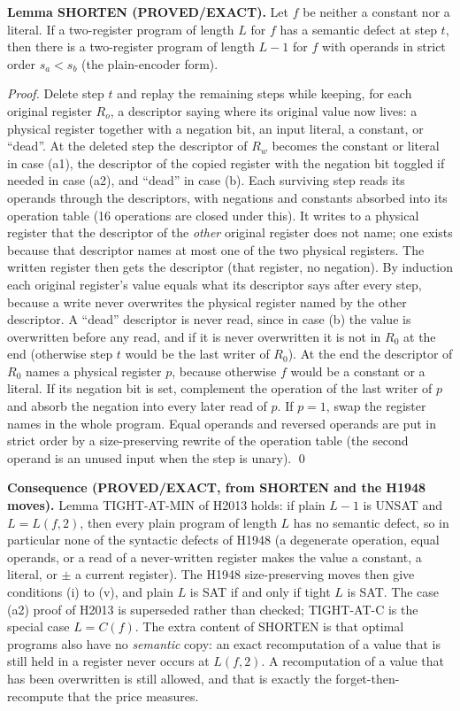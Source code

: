 \documentclass[11pt]{article}
\begin{document}
\textbf{Lemma SHORTEN (PROVED/EXACT).} Let $f$ be neither a constant nor a literal. If a two-register program of length $L$ for $f$ has a semantic defect at step $t$, then there is a two-register program of length $L-1$ for $f$ with operands in strict order $s_a<s_b$ (the plain-encoder form).

\emph{Proof.} Delete step $t$ and replay the remaining steps while keeping, for each original register $R_o$, a descriptor saying where its original value now lives: a physical register together with a negation bit, an input literal, a constant, or ``dead''. At the deleted step the descriptor of $R_w$ becomes the constant or literal in case (a1), the descriptor of the copied register with the negation bit toggled if needed in case (a2), and ``dead'' in case (b). Each surviving step reads its operands through the descriptors, with negations and constants absorbed into its operation table (16 operations are closed under this). It writes to a physical register that the descriptor of the \emph{other} original register does not name; one exists because that descriptor names at most one of the two physical registers. The written register then gets the descriptor (that register, no negation). By induction each original register's value equals what its descriptor says after every step, because a write never overwrites the physical register named by the other descriptor. A ``dead'' descriptor is never read, since in case (b) the value is overwritten before any read, and if it is never overwritten it is not in $R_0$ at the end (otherwise step $t$ would be the last writer of $R_0$). At the end the descriptor of $R_0$ names a physical register $p$, because otherwise $f$ would be a constant or a literal. If its negation bit is set, complement the operation of the last writer of $p$ and absorb the negation into every later read of $p$. If $p=1$, swap the register names in the whole program. Equal operands and reversed operands are put in strict order by a size-preserving rewrite of the operation table (the second operand is an unused input when the step is unary). \qed

\textbf{Consequence (PROVED/EXACT, from SHORTEN and the H1948 moves).} Lemma TIGHT-AT-MIN of H2013 holds: if plain $L-1$ is UNSAT and $L=L(f,2)$, then every plain program of length $L$ has no semantic defect, so in particular none of the syntactic defects of H1948 (a degenerate operation, equal operands, or a read of a never-written register makes the value a constant, a literal, or $\pm$ a current register). The H1948 size-preserving moves then give conditions (i) to (v), and plain $L$ is SAT if and only if tight $L$ is SAT. The case (a2) proof of H2013 is superseded rather than checked; TIGHT-AT-C is the special case $L=C(f)$. The extra content of SHORTEN is that optimal programs also have no \emph{semantic} copy: an exact recomputation of a value that is still held in a register never occurs at $L(f,2)$. A recomputation of a value that has been overwritten is still allowed, and that is exactly the forget-then-recompute that the price measures.
\end{document}

